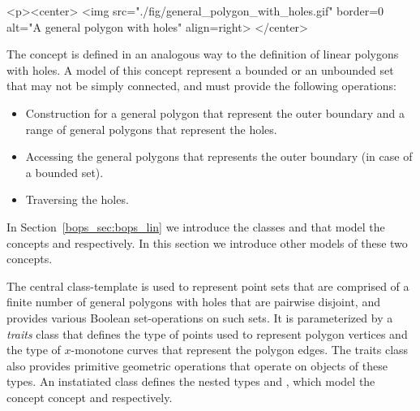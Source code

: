 \lcTex{%
  \setlength{\widthRight}{1.4cm}
  \setlength{\widthLeft}{\widthLineReal}
  \addtolength{\widthLeft}{-\widthRight}
  \begin{minipage}{\widthLeft}
}
\label{fig:general_polygon_with_holes}
\begin{ccHtmlOnly}
  <p><center>
    <img src="./fig/general_polygon_with_holes.gif" border=0 alt="A general polygon with holes" align=right>
  </center>
\end{ccHtmlOnly}
The concept  is defined in an analogous
way to the definition of linear polygons with holes. A model of this
concept represent a bounded or an unbounded set that may not be simply
connected, and must provide the following operations:
\begin{itemize}
\item Construction for a general polygon that represent the outer boundary
and a range of general polygons that represent the holes.
\item Accessing the general polygons that represents the outer boundary
(in case of a bounded set).
\item Traversing the holes.
\end{itemize}
In Section~\ref{bops_sec:bops_lin} we introduce the classes
 and  that model the concepts
 and 
respectively. In this section we introduce other models of these two
concepts.

The central class-template  is used to
represent point sets that are comprised of a finite number of general
polygons with holes that are pairwise disjoint, and provides various Boolean
set-operations on such sets. It is parameterized by a {\em traits}
class that defines the type of points used to represent polygon
vertices and the type of $x$-monotone curves that represent the
polygon edges. The traits class also provides primitive geometric
operations that operate on objects of these types. An instatiated
 class defines the nested types 
 and
, which model
the concept  concept and
 respectively.


